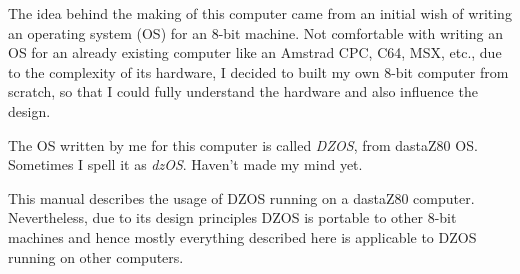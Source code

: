 \documentclass[a4paper,11pt]{article}
\begin{document}
    The idea behind the making of this computer came from an initial wish of
    writing an operating system (OS) for an 8-bit machine. Not comfortable with
    writing an OS for an already existing computer like an Amstrad CPC, C64,
    MSX, etc., due to the complexity of its hardware, I decided to built my own
    8-bit computer from scratch, so that I could fully understand the hardware
    and also influence the design.

    The OS written by me for this computer is called \textit{DZOS}, from 
    dastaZ80 OS. Sometimes I spell it as \textit{dzOS}. Haven’t made my mind 
    yet.

    This manual describes the usage of DZOS running on a dastaZ80 computer.
    Nevertheless, due to its design principles DZOS is portable to other 8-bit
    machines and hence mostly everything described here is applicable to DZOS
    running on other computers.
    
    \pagebreak
\end{document}
